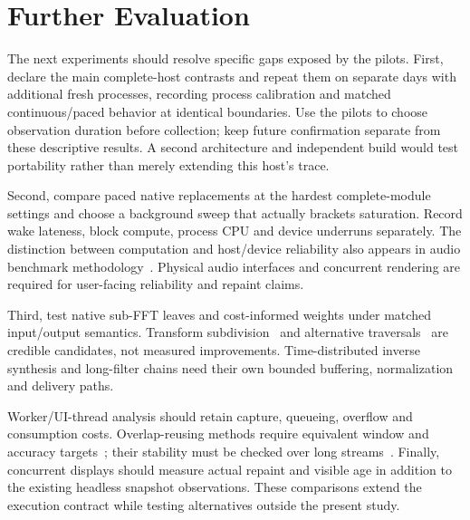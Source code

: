 \section{Further Evaluation}
\label{app:evaluation-agenda}
The next experiments should resolve specific gaps exposed by the pilots.
First, declare the main complete-host contrasts and repeat them on separate
days with additional fresh processes, recording process calibration and
matched continuous/paced behavior at identical boundaries. Use the pilots to
choose observation duration before collection; keep future confirmation
separate from these descriptive results. A second architecture and independent
build would test portability rather than merely extending this host's trace.

Second, compare paced native replacements at the hardest complete-module
settings and choose a background sweep that actually brackets saturation.
Record wake lateness, block compute, process CPU and device underruns separately.
The distinction between computation and host/device reliability also appears
in audio benchmark methodology~\cite{skare2024,balasubramaniam2026}. Physical
audio interfaces and concurrent rendering are required for user-facing
reliability and repaint claims.

Third, test native sub-FFT leaves and cost-informed weights under matched
input/output semantics. Transform subdivision~\cite{wefers2015} and alternative
traversals~\cite{becoulet2021} are credible candidates, not measured improvements.
Time-distributed inverse synthesis and long-filter chains need their own
bounded buffering, normalization and delivery paths.

Worker/UI-thread analysis should retain capture, queueing, overflow and
consumption costs. Overlap-reusing methods require equivalent window and
accuracy targets~\cite{garrido2016,park2014,rafii2018,eleftheriadis2023}; their
stability must be checked over long streams~\cite{vanderbyl2016}. Finally,
concurrent displays should measure actual repaint and visible age in addition
to the existing headless snapshot observations. These comparisons extend the
execution contract while testing alternatives outside the present study.
